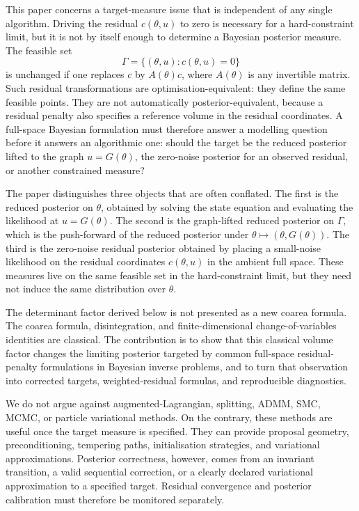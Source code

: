 \documentclass[11pt]{article}
\begin{document}
This paper concerns a target-measure issue that is independent of any single algorithm. Driving the residual \(c(\theta,u)\) to zero is necessary for a hard-constraint limit, but it is not by itself enough to determine a Bayesian posterior measure. The feasible set
\[
 \Gamma = \{(\theta,u): c(\theta,u)=0\}
\]
is unchanged if one replaces \(c\) by \(A(\theta)c\), where \(A(\theta)\) is any invertible matrix. Such residual transformations are optimisation-equivalent: they define the same feasible points. They are not automatically posterior-equivalent, because a residual penalty also specifies a reference volume in the residual coordinates. A full-space Bayesian formulation must therefore answer a modelling question before it answers an algorithmic one: should the target be the reduced posterior lifted to the graph \(u=G(\theta)\), the zero-noise posterior for an observed residual, or another constrained measure?

The paper distinguishes three objects that are often conflated. The first is the reduced posterior on \(\theta\), obtained by solving the state equation and evaluating the likelihood at \(u=G(\theta)\). The second is the graph-lifted reduced posterior on \(\Gamma\), which is the push-forward of the reduced posterior under \(\theta\mapsto(\theta,G(\theta))\). The third is the zero-noise residual posterior obtained by placing a small-noise likelihood on the residual coordinates \(c(\theta,u)\) in the ambient full space. These measures live on the same feasible set in the hard-constraint limit, but they need not induce the same distribution over \(\theta\).

The determinant factor derived below is not presented as a new coarea formula. The coarea formula, disintegration, and finite-dimensional change-of-variables identities are classical. The contribution is to show that this classical volume factor changes the limiting posterior targeted by common full-space residual-penalty formulations in Bayesian inverse problems, and to turn that observation into corrected targets, weighted-residual formulas, and reproducible diagnostics.

We do not argue against augmented-Lagrangian, splitting, ADMM, SMC, MCMC, or particle variational methods. On the contrary, these methods are useful once the target measure is specified. They can provide proposal geometry, preconditioning, tempering paths, initialisation strategies, and variational approximations. Posterior correctness, however, comes from an invariant transition, a valid sequential correction, or a clearly declared variational approximation to a specified target. Residual convergence and posterior calibration must therefore be monitored separately.
\end{document}
